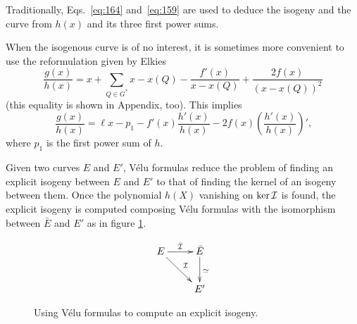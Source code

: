 \begin{remark}
  Traditionally, Eqs.~\eqref{eq:164} and~\eqref{eq:159} are used to
  deduce the isogeny and the curve from $h(x)$ and its three first
  power sums.

  When the isogenous curve is of no interest, it is sometimes more
  convenient to use the reformulation given by Elkies~\cite{elkies98}
  \begin{equation}
    \label{eq:157}
    \frac{g(x)}{h(x)} = x + \sum_{Q\in G^\ast}x - x(Q) - \frac{f'(x)}{x-x(Q)} + \frac{2f(x)}{(x-x(Q))^2}
  \end{equation}
  (this equality is shown in Appendix, too). This implies
  \begin{equation}
    \label{eq:165}
    \frac{g(x)}{h(x)} = \ell x - p_1 - f'(x)\frac{h'(x)}{h(x)} -
    2f(x)\left(\frac{h'(x)}{h(x)}\right)'
    \text{,}
  \end{equation}
  where $p_1$ is the first power sum of $h$.
\end{remark}

Given two curves $E$ and $E'$, Vélu formulas reduce the problem of
finding an explicit isogeny between $E$ and $E'$ to that of finding
the kernel of an isogeny between them. Once the polynomial $h(X)$
vanishing on $\ker\mathcal{I}$ is found, the explicit isogeny is computed
composing Vélu formulas with the isomorphism between $\bar{E}$ and
$E'$ as in figure \ref{fig:velu}.

\begin{figure}
  \centering
  \[\xymatrix{
    E \ar[r]^{\bar{\I}} \ar[rd]^\I & \bar{E} \ar[d]^{\simeq}\\
    & E'
  }\]
  \caption{Using Vélu formulas to compute an explicit isogeny.}
  \label{fig:velu}
\end{figure}




%
